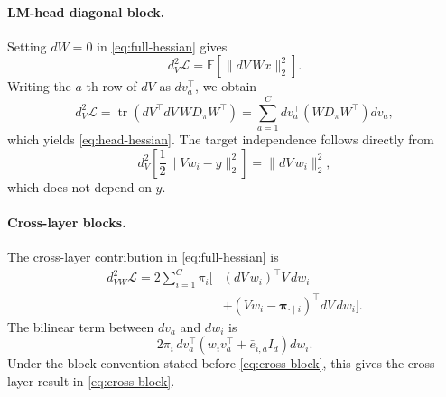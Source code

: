 \documentclass[11pt]{article}
\newcommand{\E}{\mathbb{E}}
\newcommand{\tr}{\operatorname{tr}}
\begin{document}
\paragraph{LM-head diagonal block.}
Setting \(dW=0\) in \eqref{eq:full-hessian} gives
\begin{equation*}
d_V^2\mathcal{L}
=\E\!\left[\|dV\,Wx\|_2^2\right].
\end{equation*}
Writing the \(a\)-th row of \(dV\) as \(dv_a^\top\), we obtain
\begin{equation*}
d_V^2\mathcal{L}
=\tr\!\left(dV^\top dV\,WD_\pi W^\top\right)
=\sum_{a=1}^C
dv_a^\top\left(WD_\pi W^\top\right)dv_a,
\end{equation*}
which yields \eqref{eq:head-hessian}.  The target independence follows
directly from
\begin{equation*}
d_V^2\!\left[\frac12\|Vw_i-y\|_2^2\right]
=\|dV\,w_i\|_2^2,
\end{equation*}
which does not depend on \(y\).

\paragraph{Cross-layer blocks.}
The cross-layer contribution in \eqref{eq:full-hessian} is
\begin{equation*}
\begin{aligned}
d_{VW}^2\mathcal{L}
=2\sum_{i=1}^C\pi_i\Big[
&(dV\,w_i)^\top V\,dw_i\\
&+\left(Vw_i-\bm{\pi}_{\cdot\mid i}\right)^\top dV\,dw_i
\Big].
\end{aligned}
\end{equation*}
The bilinear term between \(dv_a\) and \(dw_i\) is
\begin{equation*}
2\pi_i\,dv_a^\top
\left(w_iv_a^\top+\bar e_{i,a}I_d\right)dw_i.
\end{equation*}
Under the block convention stated before \eqref{eq:cross-block}, this gives
the cross-layer result in \eqref{eq:cross-block}.
\end{document}

